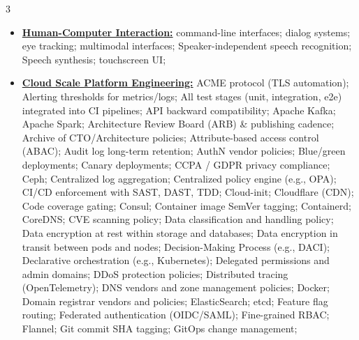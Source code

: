 \documentclass[letterpaper,11pt]{article}
\begin{document}
\begin{multicols}{3}
{\begin{itemize}[leftmargin=0.1in, label={}, itemsep=0pt, parsep=0pt, topsep=0pt, partopsep=0pt]
                \item
                \textbf{\uline{Human-Computer Interaction:}} \hspace{0pt}
                command-line interfaces;
                dialog systems;
                eye tracking;
                multimodal interfaces;
                Speaker-independent speech recognition;
                Speech synthesis;
                touchscreen UI;
                \item
                \textbf{\uline{Cloud Scale Platform Engineering:}} \hspace{0pt}
                ACME protocol (TLS automation);
                Alerting thresholds for metrics/logs;
                All test stages (unit, integration, e2e) integrated into CI pipelines;
                API backward compatibility;
                Apache Kafka;
                Apache Spark;
                Architecture Review Board (ARB) \& publishing cadence;
                Archive of CTO/Architecture policies;
                Attribute-based access control (ABAC);
                Audit log long-term retention;
                AuthN vendor policies;
                Blue/green deployments;
                Canary deployments;
                CCPA / GDPR privacy compliance;
                Ceph;
                Centralized log aggregation;
                Centralized policy engine (e.g., OPA);
                CI/CD enforcement with SAST, DAST, TDD;
                Cloud-init;
                Cloudflare (CDN);
                Code coverage gating;
                Consul;
                Container image SemVer tagging;
                Containerd;
                CoreDNS;
                CVE scanning policy;
                Data classification and handling policy;
                Data encryption at rest within storage and databases;
                Data encryption in transit between pods and nodes;
                Decision-Making Process (e.g., DACI);
                Declarative orchestration (e.g., Kubernetes);
                Delegated permissions and admin domains;
                DDoS protection policies;
                Distributed tracing (OpenTelemetry);
                DNS vendors and zone management policies;
                Docker;
                Domain registrar vendors and policies;
                ElasticSearch;
                etcd;
                Feature flag routing;
                Federated authentication (OIDC/SAML);
                Fine-grained RBAC;
                Flannel;
                Git commit SHA tagging;
                GitOps change management;

\end{itemize}}
\end{multicols}
\end{document}
